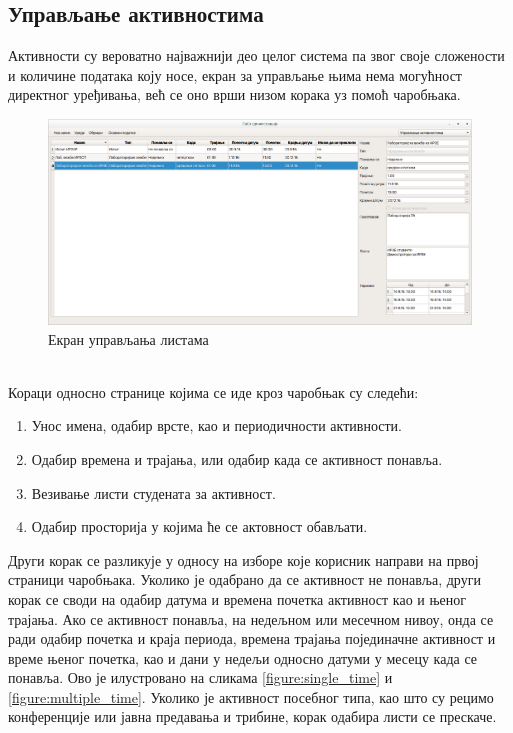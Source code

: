 \documentclass[a4paper, 12pt, diplomski]{etfcyr}
\begin{document}
			\newpage

			\subsection{Управљање активностима}
				\begin{justify}
					Активности су вероватно најважнији део целог система па звог своје сложености и количине података коју носе, екран за управљање њима нема могућност директног уређивања, већ се оно врши низом корака уз помоћ чаробњака.
					\begin{figure}[h]
						\begin{center}
							\includegraphics[width=1.0\textwidth]{manual/activities_main_window.png}
						\end{center}
						\caption{Екран управљања листама}
						\label{figure:activities_main_window}
					\end{figure}\\
					\noindent
					Кораци односно странице којима се иде кроз чаробњак су следећи:
					\begin{enumerate}[noitemsep]
						\item Унос имена, одабир врсте, као и периодичности активности.
						\item Одабир времена и трајања, или одабир када се активност понавља.
						\item Везивање листи студената за активност.
						\item Одабир просторија у којима ће се актовност обављати.
					\end{enumerate}
					Други корак се разликује у односу на изборе које корисник направи на првој страници чаробњака. Уколико је одабрано да се активност не понавља, други корак се своди на одабир датума и времена почетка активност као и њеног трајања. Ако се активност понавља, на недељном или месечном нивоу, онда се ради одабир почетка и краја периода, времена трајања појединачне активност и време њеног почетка, као и дани у недељи односно датуми у месецу када се понавља. Ово је илустровано на сликама \ref{figure:single_time} и \ref{figure:multiple_time}.
					Уколико је активност посебног типа, као што су рецимо конференције или јавна предавања и трибине, корак одабира листи се прескаче.


\end{justify}
\end{document}
